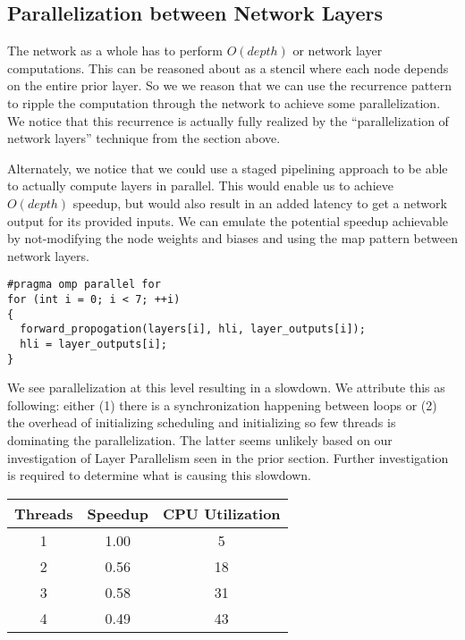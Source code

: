 \subsection*{Parallelization between Network Layers}
The network as a whole has to perform $O(depth)$ or \netdepth network layer computations.
This can be reasoned about as a stencil where each node depends on the entire prior layer.
So we we reason that we can use the recurrence pattern to ripple the computation through the network to achieve some parallelization.
We notice that this recurrence is actually fully realized by the ``parallelization of network layers'' technique from the section above.

Alternately, we notice that we could use a staged pipelining approach to be able to actually compute layers in parallel.
This would enable us to achieve $O(depth)$ speedup, but would also result in an added latency to get a network output for its provided inputs.
We can emulate the potential speedup achievable by not-modifying the node weights and biases and using the map pattern between network layers.

\begin{lstlisting}
#pragma omp parallel for
for (int i = 0; i < 7; ++i)
{
  forward_propogation(layers[i], hli, layer_outputs[i]);
  hli = layer_outputs[i];
}
\end{lstlisting}

We see parallelization at this level resulting in a slowdown.
We attribute this as following: either (1) there is a synchronization happening between loops or (2) the overhead of initializing scheduling and initializing so few threads is dominating the parallelization.
The latter seems unlikely based on our investigation of Layer Parallelism seen in the prior section.
Further investigation is required to determine what is causing this slowdown.

\begin{center}
\begin{tabular}{|c|c|c|}
  \hline
  Threads & Speedup & CPU Utilization \\ \hline
  1 & 1.00 & 5 \\
  2 & 0.56 & 18 \\
  3 & 0.58 & 31 \\
  4 & 0.49 & 43 \\
  \hline
\end{tabular}
\end{center}


